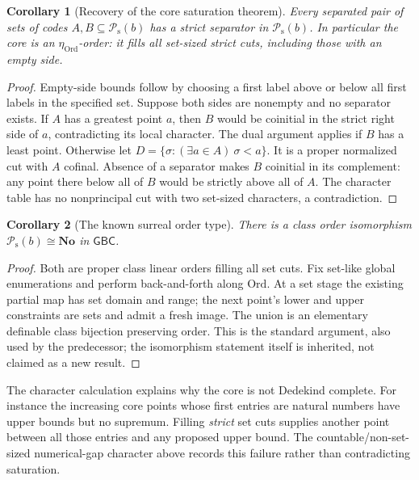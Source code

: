 \documentclass[11pt]{article}
\newtheorem{corollary}[corollary]{Corollary}
\theoremstyle{definition}
\theoremstyle{remark}
\newcommand{\No}{\mathbf{No}}
\newcommand{\Ord}{\mathrm{Ord}}
\newcommand{\Psupp}{\mathcal P_{\mathrm{s}}}
\newcommand{\GBC}{\mathsf{GBC}}
\begin{document}
\begin{corollary}[Recovery of the core saturation theorem]\label{swo:tc:cor:coreeta}
Every separated pair of sets of codes $A,B\subseteq \Psupp(b)$ has a
strict separator in $\Psupp(b)$. In particular the core is an
$\eta_{\Ord}$-order: it fills all set-sized strict cuts, including
those with an empty side.
\end{corollary}
\begin{proof}
Empty-side bounds follow by choosing a first label above or below all
first labels in the specified set. Suppose both sides are nonempty
and no separator exists. If $A$ has a greatest point $a$, then $B$
would be coinitial in the strict right side of $a$, contradicting its
local character. The dual argument applies if $B$ has a least point.
Otherwise let $D=\{\sigma:(\exists a\in A)\ \sigma<a\}$. It is a
proper normalized cut with $A$ cofinal. Absence of a separator makes
$B$ coinitial in its complement: any point there below all of $B$
would be strictly above all of $A$. The character table has no
nonprincipal cut with two set-sized characters, a contradiction.
\end{proof}

\begin{corollary}[The known surreal order type]\label{swo:tc:cor:coreNo}
There is a class order isomorphism $\Psupp(b)\cong\No$ in $\GBC$.
\end{corollary}
\begin{proof}
Both are proper class linear orders filling all set cuts. Fix set-like
global enumerations and perform back-and-forth along $\Ord$. At a set
stage the existing partial map has set domain and range; the next
point's lower and upper constraints are sets and admit a fresh image.
The union is an elementary definable class bijection preserving order.
This is the standard argument, also used by the predecessor; the
isomorphism statement itself is inherited, not claimed as a new result.
\end{proof}

The character calculation explains why the core is not Dedekind complete.
For instance the increasing core points whose first entries are natural
numbers have upper bounds but no supremum. Filling \emph{strict} set
cuts supplies another point between all those entries and any proposed
upper bound. The countable/non-set-sized numerical-gap character above
records this failure rather than contradicting saturation.
\end{document}
